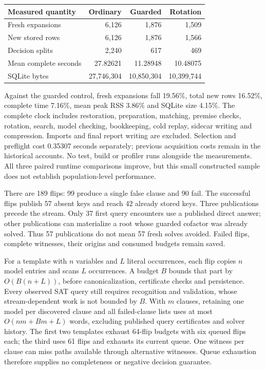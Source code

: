 \documentclass[11pt,a4paper]{article}
\numberwithin{equation}{section}
\theoremstyle{plain}
\theoremstyle{definition}
\theoremstyle{remark}
\begin{document}
\begin{center}
\begin{tabular}{lrrr}
\hline
Measured quantity & Ordinary & Guarded & Rotation \\
\hline
Fresh expansions & 6,126 & 1,876 & 1,509 \\
New stored rows & 6,126 & 1,876 & 1,566 \\
Decision splits & 2,240 & 617 & 469 \\
Mean complete seconds & 27.82621 & 11.28948 & 10.48075 \\
SQLite bytes & 27,746,304 & 10,850,304 & 10,399,744 \\
\hline
\end{tabular}
\end{center}

Against the guarded control, fresh expansions fall 19.56\%, total new rows
16.52\%, complete time 7.16\%, mean peak RSS 3.86\% and SQLite size 4.15\%.
The complete clock includes restoration, preparation, matching, premise checks,
rotation, search, model checking, bookkeeping, cold replay, sidecar writing and
compression. Imports and final report writing are excluded. Selection and
preflight cost 0.35307 seconds separately; previous acquisition costs remain
in the historical accounts. No test, build or profiler runs alongside the
measurements. All three paired runtime comparisons improve, but this small
constructed sample does not establish population-level performance.

There are 189 flips: 99 produce a single false clause and 90 fail. The successful
flips publish 57 absent keys and reach 42 already stored keys. Three publications
precede the stream. Only 37 first query encounters use a published direct answer;
other publications can materialize a root whose guarded cofactor was already
solved. Thus 57 publications do not mean 57 fresh solves avoided. Failed flips,
complete witnesses, their origins and consumed budgets remain saved.

For a template with $n$ variables and $L$ literal occurrences, each flip copies
$n$ model entries and scans $L$ occurrences. A budget $B$ bounds that part by
$O(B(n+L))$, before canonicalization, certificate checks and persistence.
Every observed SAT query still requires recognition and validation, whose
stream-dependent work is not bounded by $B$. With $m$ clauses, retaining one
model per discovered clause and all failed-clause lists uses at most
$O(nm+Bm+L)$ words, excluding published query certificates and solver history.
The first two templates exhaust 64-flip budgets with six queued flips each;
the third uses 61 flips and exhausts its current queue. One witness per clause
can miss paths available through alternative witnesses. Queue exhaustion
therefore supplies no completeness or negative decision guarantee.
\end{document}
